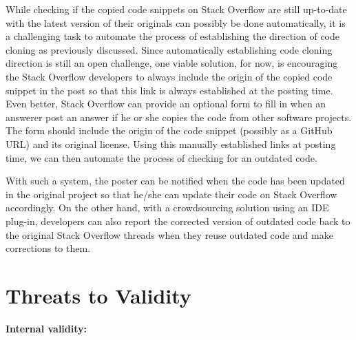 \documentclass[10pt,journal,compsoc]{IEEEtran}
\begin{document}
While checking if the copied code snippets on Stack Overflow are still
up-to-date with the latest version of their originals can possibly be done
automatically, it is a challenging task to automate the process of establishing
the direction of code cloning as previously discussed. 
Since automatically establishing code cloning direction
is still an open challenge, one viable solution, for now, is
encouraging the Stack Overflow developers to always include the origin of the
copied code snippet in the post so that this link is always established at the
posting time. Even better, Stack Overflow can provide an optional form to fill
in when an answerer post an answer if he or she copies the code from other software
projects. The form should include the origin of the code snippet (possibly as a
GitHub URL) and its original license. Using this manually established links at
posting time, we can then automate the process of checking for an outdated code.

With such a system, the poster can be notified when the code has been updated in
the original project so that he/she can update their code on Stack Overflow
accordingly. On the other hand, with a crowdsourcing solution using an IDE
plug-in, developers can also report the corrected version of outdated code back
to the original Stack Overflow threads when they reuse outdated code and make
corrections to them.



\section{Threats to Validity}

\textbf{Internal validity:} 
\end{document}
